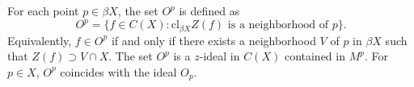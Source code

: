 For each point $p \in \beta X$, the set $O^p$ is defined as
$$O^p = \{f \in C(X) : \mathrm{cl}_{\beta X} Z(f) \text{ is a neighborhood of } p\}.$$
Equivalently, $f \in O^p$ if and only if there exists a neighborhood $V$ of $p$ in $\beta X$ such that $Z(f) \supset V \cap X$. The set $O^p$ is a $z$-ideal in $C(X)$ contained in $M^p$. For $p \in X$, $O^p$ coincides with the ideal $O_p$.
